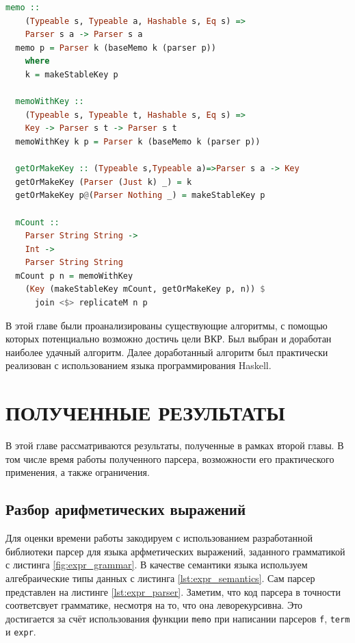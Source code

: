 \documentclass[times]{itmo-student-thesis}
\begin{document}
\begin{lstlisting}[language=Haskell,float=!h,caption={Исправленный mCount},label={lst:mcount_fixed}]
  memo :: 
    (Typeable s, Typeable a, Hashable s, Eq s) => 
    Parser s a -> Parser s a
  memo p = Parser k (baseMemo k (parser p))
    where
    k = makeStableKey p

  memoWithKey :: 
    (Typeable s, Typeable t, Hashable s, Eq s) => 
    Key -> Parser s t -> Parser s t
  memoWithKey k p = Parser k (baseMemo k (parser p))

  getOrMakeKey :: (Typeable s,Typeable a)=>Parser s a -> Key
  getOrMakeKey (Parser (Just k) _) = k
  getOrMakeKey p@(Parser Nothing _) = makeStableKey p

  mCount :: 
    Parser String String -> 
    Int -> 
    Parser String String
  mCount p n = memoWithKey 
    (Key (makeStableKey mCount, getOrMakeKey p, n)) $ 
      join <$> replicateM n p
\end{lstlisting}

\chapterconclusion

В этой главе были проанализированы существующие алгоритмы, с помощью которых потенциально возможно достичь цели ВКР. 
Был выбран и доработан наиболее удачный алгоритм. Далее доработанный алгоритм был практически реализован с использованием 
языка программирования Haskell.

\chapter{ПОЛУЧЕННЫЕ РЕЗУЛЬТАТЫ}

В этой главе рассматриваются результаты, полученные в рамках второй главы. В том числе время работы полученного парсера,
возможности его практического применения, а также ограничения. 

\section{Разбор арифметических выражений}\label{sec:arith_expr}

Для оценки времени работы закодируем с использованием разработанной библиотеки парсер для языка арфметических
выражений, заданного грамматикой с листинга  \ref{fig:expr_grammar}. В качестве семантики языка используем
алгебраические типы данных с листинга \ref{lst:expr_semantics}. Сам парсер представлен на листинге \ref{lst:expr_parser}.
Заметим, что код парсера в точности соответсвует грамматике, несмотря на то, что она леворекурсивна. Это достигается за счёт
использования функции \lstinline{memo} при написании парсеров \lstinline{f}, \lstinline{term} и \lstinline{expr}.
\end{document}
